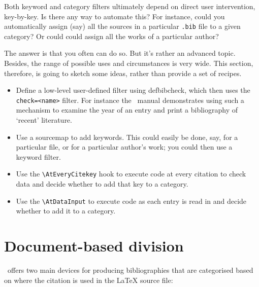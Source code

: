 Both keyword and category filters ultimately depend on direct user
intervention, key-by-key. Is there any way to automate this? For
instance, could you automatically assign (say) all the sources in a
particular \texttt{.bib} file to a given category? Or could could
assign all the works of a particular author?

The answer is that you often can do so. But it's rather an advanced
topic. Besides, the range of possible uses and circumstances is very
wide. This section, therefore, is going to sketch some ideas, rather
than provide a set of recipes.

\begin{itemize}
\item Define a low-level user-defined filter using defbibcheck, which
  then uses the \texttt{check=\textless{}name\textgreater{}}
  filter. For instance the \biblatex\ manual demonstrates using such a
  mechanism to examine the year of an entry and print a bibliography
  of `recent' literature.
\item Use a sourcemap to add keywords. This could easily be done, say,
  for a particular file, or for a particular author's work; you could
  then use a keyword filter.
\item Use the \texttt{\textbackslash{}AtEveryCitekey} hook to execute
  code at every citation to check data and decide whether to add that
  key to a category.
\item Use the \texttt{\textbackslash{}AtDataInput} to execute code as
  each entry is read in and decide whether to add it to a category.
\end{itemize}

\section{Document-based division}

\biblatex\ offers two main devices for producing bibliographies that are
categorised based on where the citation is used in the LaTeX source
file:

